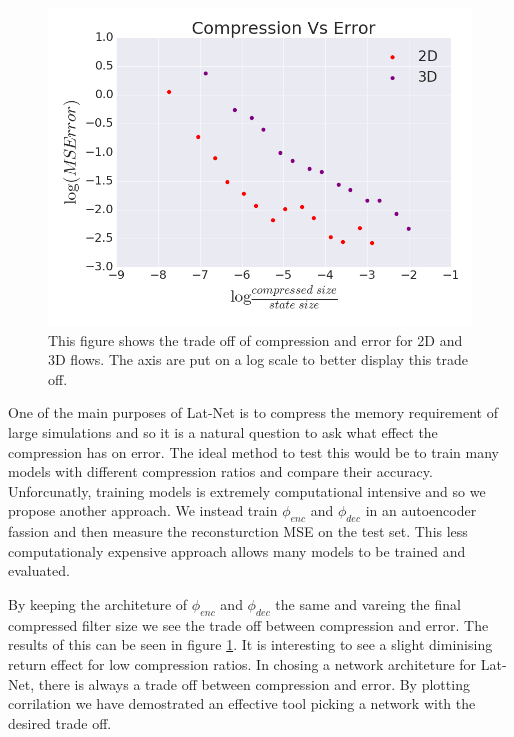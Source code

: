 \documentclass{article}
\begin{document}
\begin{figure}
  \centering
  \includegraphics[scale=0.3]{../test/figs/compression_error_plot.png}
  \caption{This figure shows the trade off  of compression and error for 2D and 3D flows. The axis are put on a log scale to better display this trade off.}
  \label{compression_plot}
\end{figure}

One of the main purposes of Lat-Net is to compress the memory requirement of large simulations and so it is a natural question to ask what effect the compression has on error. The ideal method to test this would be to train many models with different compression ratios and compare their accuracy. Unforcunatly, training models is extremely computational intensive and so we propose another approach. We instead train $\phi_{enc}$ and $\phi_{dec}$ in an autoencoder fassion and then measure the reconsturction MSE on the test set. This less computationaly expensive approach allows many models to be trained and evaluated.

By keeping the architeture of $\phi_{enc}$ and $\phi_{dec}$ the same and vareing the final compressed filter size we see the trade off between compression and error. The results of this can be seen in figure \ref{compression_plot}. It is interesting to see a slight diminising return effect for low compression ratios. In chosing a network architeture for Lat-Net, there is always a trade off between compression and error. By plotting corrilation we have demostrated an effective tool picking a network with the desired trade off.
\end{document}
